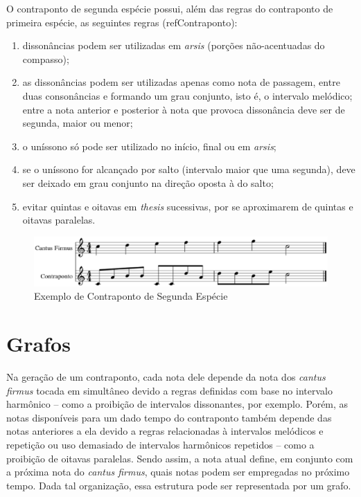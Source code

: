         O contraponto de segunda espécie possui, além das regras do contraponto de primeira espécie, as seguintes regras (refContraponto):

        \begin{enumerate}
          \item dissonâncias podem ser utilizadas em \textit{arsis} (porções não-acentuadas do compasso);
          \item as dissonâncias podem ser utilizadas apenas como nota de passagem, entre duas consonâncias e formando um grau conjunto, isto é, o intervalo melódico; entre a nota anterior e posterior à nota que provoca dissonância deve ser de segunda, maior ou menor;
          \item o uníssono só pode ser utilizado no início, final ou em \textit{arsis};
          \item se o uníssono for alcançado por salto (intervalo maior que uma segunda), deve ser deixado em grau conjunto na direção oposta à do salto;
          \item evitar quintas e oitavas em \textit{thesis} sucessivas, por se aproximarem de quintas e oitavas paralelas.
        \end{enumerate}

        \begin{figure}[htb]
          \centering
          \includegraphics[scale=0.55]{figuras/contrapontosegunda.eps}
          \caption{Exemplo de Contraponto de Segunda Espécie}
          \label{contrapontosegunda}
        \end{figure}

  \section[Grafos]{Grafos}

    Na geração de um contraponto, cada nota dele depende da nota dos \textit{cantus firmus} tocada em simultâneo devido a regras definidas com base no intervalo harmônico -- como a proibição de intervalos dissonantes, por exemplo. Porém, as notas disponíveis para um dado tempo do contraponto também depende das notas anteriores a ela devido a regras relacionadas à intervalos melódicos e repetição ou uso demasiado de intervalos harmônicos repetidos -- como a proibição de oitavas paralelas. Sendo assim, a nota atual define, em conjunto com a próxima nota do \textit{cantus firmus}, quais notas podem ser empregadas no próximo tempo. Dada tal organização, essa estrutura pode ser representada por um grafo.

